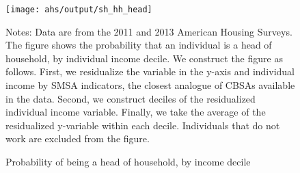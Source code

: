 \begin{figure}[h!]
    \centering
    \caption{Probability of being a head of household, by income decile}
    \label{fig:ahs_hhead}

    \texttt{[image: ahs/output/sh\_hh\_head]}
    
    \begin{minipage}{.95\textwidth} \footnotesize
        \vspace{3mm}
        Notes: Data are from the 2011 and 2013 American Housing Surveys.
        The figure shows the probability that an individual is a head of
        household, by individual income decile.
        We construct the figure as follows.
        First, we residualize the variable in the y-axis and individual income 
        by SMSA indicators, the closest analogue of CBSAs available in the data.
        Second, we construct deciles of the residualized individual income 
        variable.
        Finally, we take the average of the residualized y-variable within each 
        decile.
        Individuals that do not work are excluded from the figure.
    \end{minipage}
\end{figure}
